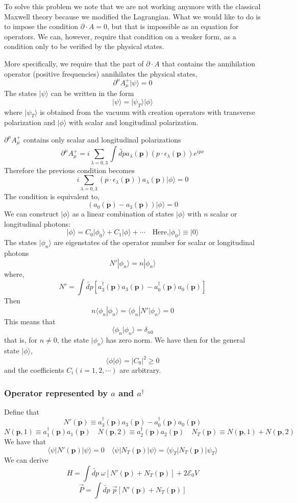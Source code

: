 To solve this problem we note that we are not working anymore with the classical Maxwell theory because we modified the Lagrangian. What we would like to do is to impose the condition $\partial \cdot A = 0$, but that is impossible as an equation for operators. We can, however, require that condition on a weaker form, as a condition only to be verified by the physical states.

More specifically, we require that the part of $\partial \cdot A$ that contains the annihilation operator (positive frequencies) annihilates the physical states,
\[\partial^{\mu} A^{+}_{\mu} | \psi \rangle = 0\]
The states $| \psi \rangle$ can be written in the form
\[| \psi \rangle = | \psi_T \rangle | \phi \rangle\]
where $| \psi_T \rangle$  is obtained from the vacuum with creation operators with transverse polarization and $| \phi \rangle$ with scalar and longitudinal polarization.

$\partial^{\mu} A^{+}_{\mu}$ contains only scalar and longitudinal polarizations
\[\partial^{\mu} A^{+}_{\mu} = i\sum_{\lambda=0,3} \int \widetilde{dp} a_{\lambda}(\bm{p}) (p \cdot \epsilon_{\lambda}(\bm{p}) ) e^{ipx} \]
Therefore the previous condition becomes
\[i\sum_{\lambda=0,3} (p \cdot \epsilon_{\lambda}(\bm{p})) a_{\lambda}(\bm{p})  | \phi \rangle = 0\]
The condition is equivalent to,
\[(a_{0}(\bm{p}) - a_{3}(\bm{p})) | \phi \rangle = 0\]
We can construct $| \phi \rangle$ as a linear combination of states $| \phi \rangle$ with $n$ scalar or longitudinal photons:
\[| \phi \rangle = C_0 | \phi_0 \rangle + C_1 | \phi \rangle + \cdots \quad \mbox{Here,} | \phi_0 \rangle \equiv | 0 \rangle\]
The states $|\phi_n\rangle$ are eigenstates of the operator number for scalar or longitudinal photons
\[N' | \phi_n \rangle = n | \phi_n \rangle\]
where,
\[N' = \int \widetilde{dp} [a^{\dagger}_{3}(\bm{p})a_{3}(\bm{p})-a^{\dagger}_{0}(\bm{p})a_{0}(\bm{p})] \]
Then
\[n \langle \phi_n | \phi_n \rangle = \langle \phi_n |N'| \phi_n \rangle = 0\]
This means that
\[\langle \phi_n | \phi_n \rangle = \delta_{n0}\]
that is, for $n \neq 0$, the state $| \phi_n \rangle$ has zero norm. We have then for the general state $| \phi \rangle$,
\[\langle \phi | \phi \rangle = |C_0|^2 \geq 0\]
and the coefficients $C_i(i=1,2,\cdots)$ are arbitrary.

\subsubsection{Operator represented by $a$ and $a^{\dagger}$}
\noindent
Define that
\[N'(\bm{p}) \equiv a^{\dagger}_{3}(\bm{p})a_{3}(\bm{p})-a^{\dagger}_{0}(\bm{p})a_{0}(\bm{p})\]
\[N(\bm{p},1) \equiv a^{\dagger}_{1}(\bm{p}) a_{1}(\bm{p}) \quad N(\bm{p},2) \equiv a^{\dagger}_{2}(\bm{p}) a_{2}(\bm{p}) \quad N_T(\bm{p}) \equiv N(\bm{p},1) + N(\bm{p},2)\]
We have that
\[\langle \psi | N'(\bm{p}) | \psi\rangle = 0 \quad \langle \psi | N_T(\bm{p}) | \psi\rangle = \langle \psi_T | N_T(\bm{p}) | \psi_T\rangle\]
We can derive
\[ H = \int \widetilde{dp} \; \omega [N'(\bm{p}) + N_T(\bm{p})] + 2\mathcal{E}_0V\]
\[ \vec{P} = \int \widetilde{dp} \; \vec{p} [N'(\bm{p}) + N_T(\bm{p})]\]

